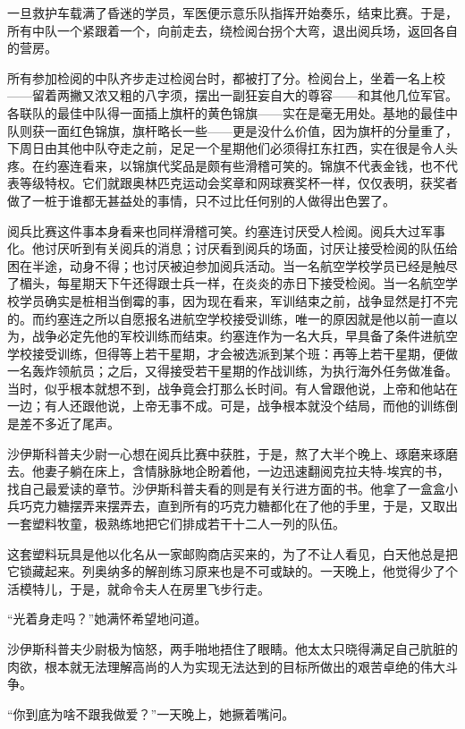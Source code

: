     一旦救护车载满了昏迷的学员，军医便示意乐队指挥开始奏乐，结束比赛。于是，所有中队一个紧跟着一个，向前走去，绕检阅台拐个大弯，退出阅兵场，返回各自的营房。

    所有参加检阅的中队齐步走过检阅台时，都被打了分。检阅台上，坐着一名上校——留着两撇又浓又粗的八字须，摆出一副狂妄自大的尊容——和其他几位军官。各联队的最佳中队得一面插上旗杆的黄色锦旗——实在是毫无用处。基地的最佳中队则获一面红色锦旗，旗杆略长一些——更是没什么价值，因为旗杆的分量重了，下周日由其他中队夺走之前，足足一个星期他们必须得扛东扛西，实在很是令人头疼。在约塞连看来，以锦旗代奖品是颇有些滑稽可笑的。锦旗不代表金钱，也不代表等级特权。它们就跟奥林匹克运动会奖章和网球赛奖杯一样，仅仅表明，获奖者做了一桩于谁都无甚益处的事情，只不过比任何别的人做得出色罢了。

    阅兵比赛这件事本身看来也同样滑稽可笑。约塞连讨厌受人检阅。阅兵大过军事化。他讨厌听到有关阅兵的消息；讨厌看到阅兵的场面，讨厌让接受检阅的队伍给困在半途，动身不得；也讨厌被迫参加阅兵活动。当一名航空学校学员已经是触尽了楣头，每星期天下午还得跟士兵一样，在炎炎的赤日下接受检阅。当一名航空学校学员确实是桩相当倒霉的事，因为现在看来，军训结束之前，战争显然是打不完的。而约塞连之所以自愿报名进航空学校接受训练，唯一的原因就是他以前一直以为，战争必定先他的军校训练而结束。约塞连作为一名大兵，早具备了条件进航空学校接受训练，但得等上若干星期，才会被选派到某个班：再等上若干星期，便做一名轰炸领航员；之后，又得接受若干星期的作战训练，为执行海外任务做准备。当时，似乎根本就想不到，战争竟会打那么长时间。有人曾跟他说，上帝和他站在一边；有人还跟他说，上帝无事不成。可是，战争根本就没个结局，而他的训练倒是差不多近了尾声。

    沙伊斯科普夫少尉一心想在阅兵比赛中获胜，于是，熬了大半个晚上、琢磨来琢磨去。他妻子躺在床上，含情脉脉地企盼着他，一边迅速翻阅克拉夫特-埃宾的书，找自己最爱读的章节。沙伊斯科普夫看的则是有关行进方面的书。他拿了一盒盒小兵巧克力糖摆弄来摆弄去，直到所有的巧克力糖都化在了他的手里，于是，又取出一套塑料牧童，极熟练地把它们排成若干十二人一列的队伍。

    这套塑料玩具是他以化名从一家邮购商店买来的，为了不让人看见，白天他总是把它锁藏起来。列奥纳多的解剖练习原来也是不可或缺的。一天晚上，他觉得少了个活模特儿，于是，就命令夫人在房里飞步行走。

    “光着身走吗？”她满怀希望地问道。

    沙伊斯科普夫少尉极为恼怒，两手啪地捂住了眼睛。他太太只晓得满足自己肮脏的肉欲，根本就无法理解高尚的人为实现无法达到的目标所做出的艰苦卓绝的伟大斗争。

    “你到底为啥不跟我做爱？”一天晚上，她撅着嘴问。

